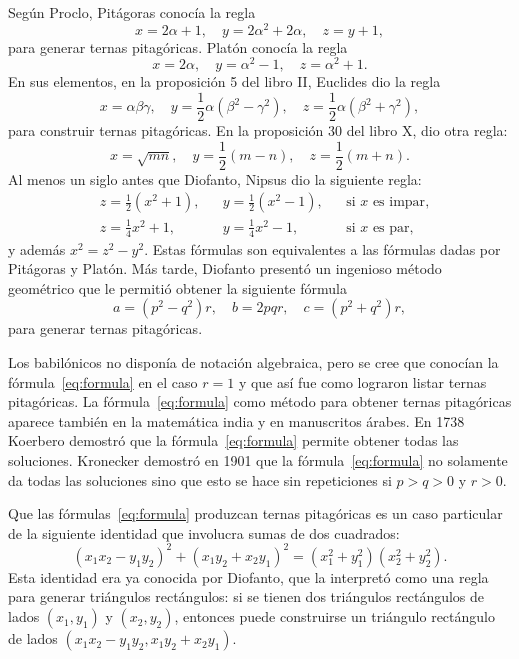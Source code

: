 Según Proclo, Pitágoras conocía la regla 
\[
	x=2\alpha+1,\quad
	y=2\alpha^2+2\alpha,\quad
	z=y+1,
\]
para generar ternas pitagóricas. Platón conocía la regla 
\[
	x=2\alpha,\quad
	y=\alpha^2-1,\quad
	z=\alpha^2+1.
\]
En sus elementos, en la proposición 5 del libro II, Euclides dio la regla 
\[
		x=\alpha\beta\gamma,
		\quad
		y=\frac12\alpha(\beta^2-\gamma^2),
		\quad
		z=\frac12\alpha(\beta^2+\gamma^2),
\]
para construir ternas pitagóricas.  En la proposición 30 del libro X, dio otra
regla:
\[
		x=\sqrt{mn},\quad
		y=\frac12(m-n),\quad
		z=\frac12(m+n).
\]
Al menos un siglo antes que Diofanto, Nipsus dio la siguiente regla: 
\begin{align*}
	&z=\frac12(x^2+1), && y=\frac12(x^2-1), &&\text{si $x$ es impar},\\
	&z=\frac14x^2+1, && y=\frac14x^2-1, &&\text{si $x$ es par},
\end{align*}
y además $x^2=z^2-y^2$. Estas fórmulas son equivalentes a las fórmulas dadas
por Pitágoras y Platón. Más tarde, Diofanto presentó un ingenioso método
geométrico que le permitió obtener la siguiente fórmula 
\begin{equation}
	\label{eq:formula}
	a=(p^2-q^2)r,\quad
	b=2pqr,\quad
	c=(p^2+q^2)r,
\end{equation}
para generar ternas pitagóricas. 

Los babilónicos no disponía de notación algebraica, pero se cree que 
conocían  
la fórmula~\eqref{eq:formula} en el caso $r=1$ y que así fue como lograron
listar ternas pitagóricas. La fórmula~\eqref{eq:formula} como método para
obtener ternas pitagóricas aparece también en la matemática india y en
manuscritos árabes. 
En 1738 Koerbero demostró que la fórmula~\eqref{eq:formula} permite obtener
todas las soluciones. Kronecker demostró en 1901 que la
fórmula~\eqref{eq:formula} no solamente da todas las soluciones sino que esto
se hace sin repeticiones si $p>q>0$ y $r>0$. 

Que las fórmulas~\eqref{eq:formula} produzcan ternas pitagóricas es un caso
particular de la siguiente identidad que involucra sumas de dos cuadrados:
\begin{equation}
	\label{eq:2cuadrados}
	(x_1x_2-y_1y_2)^2+(x_1y_2+x_2y_1)^2=(x_1^2+y_1^2)(x_2^2+y_2^2).
\end{equation}
Esta identidad era ya conocida por Diofanto, que la interpretó como una regla
para generar triángulos rectángulos: si se tienen dos triángulos rectángulos de
lados $(x_1,y_1)$ y $(x_2,y_2)$, entonces puede construirse un triángulo
rectángulo de lados $(x_1x_2-y_1y_2, x_1y_2+x_2y_1)$.  

